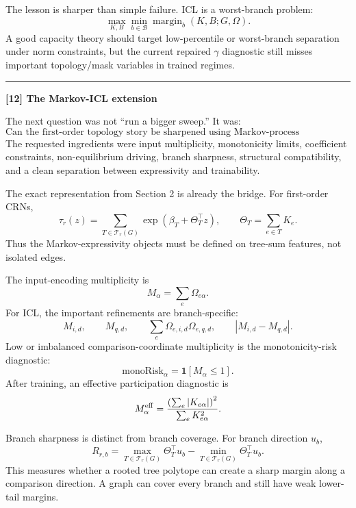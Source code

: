 \documentclass[11pt]{article}
\newcommand{\T}{\mathcal T}
\begin{document}
\vspace{0.5em}
\noindent The lesson is sharper than simple failure. ICL is a worst-branch problem:
\[
\max_{K,B}\min_{b\in\mathcal B}\operatorname{margin}_b(K,B;G,\Omega).
\]
A good capacity theory should target low-percentile or worst-branch separation under norm constraints, but the current repaired $\gamma$ diagnostic still misses important topology/mask variables in trained regimes.

\vspace{1em}
\noindent\rule{\textwidth}{0.4pt}
\vspace{1em}

\noindent\textbf{[12] The Markov-ICL extension}

\vspace{0.5em}
\noindent The next question was not ``run a bigger sweep.'' It was:
\[
\boxed{\text{Can the first-order topology story be sharpened using Markov-process expressivity theory?}}
\]
The requested ingredients were input multiplicity, monotonicity limits, coefficient constraints, non-equilibrium driving, branch sharpness, structural compatibility, and a clean separation between expressivity and trainability.

\vspace{0.5em}
\noindent The exact representation from Section 2 is already the bridge. For first-order CRNs,
\[
\tau_r(z)=\sum_{T\in\T_r(G)}\exp(\beta_T+\Theta_T^\top z),
\qquad
\Theta_T=\sum_{e\in T}K_e.
\]
Thus the Markov-expressivity objects must be defined on tree-sum features, not isolated edges.

\vspace{0.5em}
\noindent The input-encoding multiplicity is
\[
M_\alpha=\sum_e\Omega_{e\alpha}.
\]
For ICL, the important refinements are branch-specific:
\[
M_{i,d},\qquad M_{q,d},\qquad
\sum_e \Omega_{e,i,d}\Omega_{e,q,d},\qquad
|M_{i,d}-M_{q,d}|.
\]
Low or imbalanced comparison-coordinate multiplicity is the monotonicity-risk diagnostic:
\[
\mathrm{monoRisk}_\alpha=\mathbf 1[M_\alpha\leq 1].
\]
After training, an effective participation diagnostic is
\[
M^{\rm eff}_\alpha=
\frac{\left(\sum_e |K_{e\alpha}|\right)^2}{\sum_e K_{e\alpha}^2}.
\]

\vspace{0.5em}
\noindent Branch sharpness is distinct from branch coverage. For branch direction $u_b$,
\[
R_{r,b}=
\max_{T\in\T_r(G)}\Theta_T^\top u_b
-
\min_{T\in\T_r(G)}\Theta_T^\top u_b.
\]
This measures whether a rooted tree polytope can create a sharp margin along a comparison direction. A graph can cover every branch and still have weak lower-tail margins.
\end{document}
